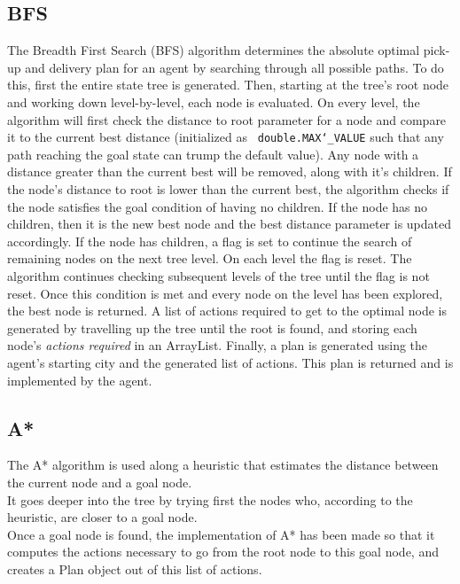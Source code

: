 \documentclass[11pt]{article}
\begin{document}
\subsection{BFS}
The Breadth First Search (BFS) algorithm determines the absolute optimal pick-up and delivery plan for an agent by searching through all possible paths. To do this, first the entire state tree is generated. Then, starting at the tree's root node and working down level-by-level, each node is evaluated. On every level, the algorithm will first check the distance to root parameter for a node and compare it to the current best distance (initialized as \texttt{ double.MAX\char`_VALUE} such that any path reaching the goal state can trump the default value). Any node with a distance greater than the current best will be removed, along with it's children. If the node's distance to root is lower than the current best, the algorithm checks if the node satisfies the goal condition of having no children. If the node has no children, then it is the new best node and the best distance parameter is updated accordingly. If the node has children, a flag is set to continue the search of remaining nodes on the next tree level. On each level the flag is reset. The algorithm continues checking subsequent levels of the tree until the flag is not reset. Once this condition is met and every node on the level has been explored, the best node is returned. A list of actions required to get to the optimal node is generated by travelling up the tree until the root is found, and storing each node's \textit{actions required} in an ArrayList. Finally, a plan is generated using the agent's starting city and the generated list of actions. This plan is returned and is implemented by the agent. 
\subsection{A*}
The A* algorithm is used along a heuristic that estimates the distance between the current node and a goal node.\\

It goes deeper into the tree by trying first the nodes who, according to the heuristic, are closer to a goal node.\\

Once a goal node is found, the implementation of A* has been made so that it computes the actions necessary to go from the root node to this goal node, and creates a Plan object out of this list of actions.\\
\end{document}

